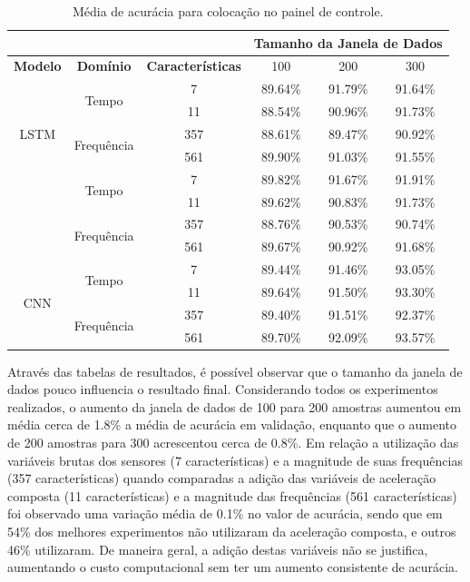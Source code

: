 \begin{table}[h!]
\scriptsize
\centering
\caption{Média de acurácia para colocação no painel de controle.}
\label{table:dashboard_results_tipo_superficie_2}
\begin{tabular}{cccccc}
\cmidrule(l){4-6}
 & \multicolumn{1}{l}{\textbf{}} & \multicolumn{1}{l}{} & \multicolumn{3}{c}{\textbf{Tamanho da Janela de Dados}} \\ \midrule
\textbf{Modelo} & \textbf{Domínio} & \textbf{Características} & 100 & 200 & \multicolumn{1}{c}{300} \\ \midrule
\multirow{5}{*}{LSTM} & \multirow{2}{*}{Tempo} & 7 & 89.64\% & \cellcolor[HTML]{34FF34}91.79\% & 91.64\% \\ \cmidrule(l){3-6} 
 &  & 11 & 88.54\% & 90.96\% & 91.73\% \\ \cmidrule(l){2-6} 
 & \multirow{2}{*}{Frequência} & 357 & 88.61\% & 89.47\% & 90.92\% \\ \cmidrule(l){3-6} 
 &  & 561 & 89.90\% & 91.03\% & 91.55\% \\ \midrule
\multirow{5}{*}{GRU} & \multirow{2}{*}{Tempo} & 7 & 89.82\% & 91.67\% & \cellcolor[HTML]{34FF34}91.91\% \\ \cmidrule(l){3-6} 
 &  & 11 & 89.62\% & 90.83\% & 91.73\% \\ \cmidrule(l){2-6} 
 & \multirow{2}{*}{Frequência} & 357 & 88.76\% & 90.53\% & 90.74\% \\ \cmidrule(l){3-6} 
 &  & 561 & 89.67\% & 90.92\% & 91.68\% \\ \midrule
\multirow{5}{*}{CNN} & \multirow{2}{*}{Tempo} & 7 & 89.44\% & 91.46\% & 93.05\% \\ \cmidrule(l){3-6} 
 &  & 11 & 89.64\% & 91.50\% & 93.30\% \\ \cmidrule(l){2-6} 
 & \multirow{2}{*}{Frequência} & 357 & 89.40\% & 91.51\% & 92.37\% \\ \cmidrule(l){3-6} 
 &  & 561 & 89.70\% & 92.09\% & \cellcolor[HTML]{34FF34}93.57\% \\ \bottomrule
\end{tabular}
\end{table}

Através das tabelas de resultados, é possível observar que o tamanho da janela de dados pouco influencia o resultado final. Considerando todos os experimentos realizados, o aumento da janela de dados de 100 para 200 amostras aumentou em média cerca de 1.8\% a média de acurácia em validação, enquanto que o aumento de 200 amostras para 300 acrescentou cerca de 0.8\%. Em relação a utilização das variáveis brutas dos sensores (7 características) e a magnitude de suas frequências (357 características) quando comparadas a adição das variáveis de aceleração composta (11 características) e a magnitude das frequências (561 características) foi observado uma variação média de 0.1\% no valor de acurácia, sendo que em 54\% dos melhores experimentos não utilizaram da aceleração composta, e outros 46\% utilizaram. De maneira geral, a adição destas variáveis não se justifica, aumentando o custo computacional sem ter um aumento consistente de acurácia.


